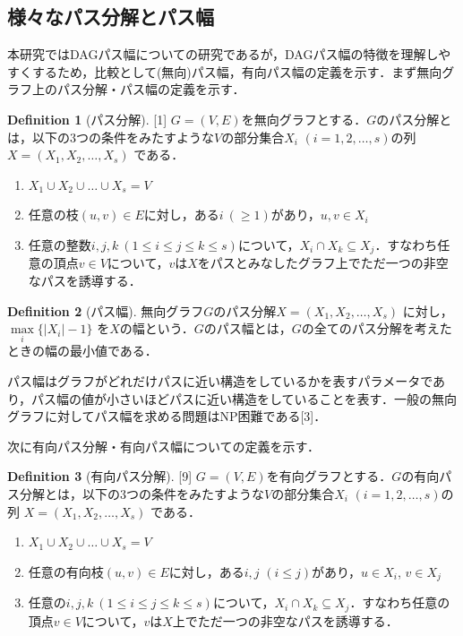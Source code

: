 \documentclass[master]{kuisthesis}		%
\theoremstyle{plain}
\theoremstyle{definition}
\newtheorem{definition*}{Definition}
\begin{document}
\subsection{様々なパス分解とパス幅} %
本研究ではDAGパス幅についての研究であるが，DAGパス幅の特徴を理解しやすくするため，比較として(無向)パス幅，有向パス幅の定義を示す．まず無向グラフ上のパス分解・パス幅の定義を示す．

\begin{definition*}[パス分解][1]
    $G=(V, E)$を無向グラフとする．$G$のパス分解とは，以下の3つの条件をみたすような$V$の部分集合$X_i$ $(i = 1, 2,  \dots, s)$の列 $X=(X_1, X_2,  \dots, X_s)$ である．
    
    \begin{enumerate}
        \item $ X_1 \cup X_2 \cup \dots \cup X_s = V $ 
        \item 任意の枝$(u, v) \in E $に対し，ある$i\ (\geq 1)$があり，$u, v \in X_i$
        \item 任意の整数$ i, j, k\ (1 \leq i \leq j \leq k \leq s)$について，$X_i \cap X_k \subseteq X_j$．すなわち任意の頂点$v \in V$について，$v$は$X$をパスとみなしたグラフ上でただ一つの非空なパスを誘導する．
    \end{enumerate}
\end{definition*}


\begin{definition*}[パス幅]
    無向グラフ$G$のパス分解$X=(X_1, X_2,   \dots, X_s)$ に対し，$ \underset{i}{\max} \{ |X_i|-1 \}$ を$X$の幅という．$G$のパス幅とは，$G$の全てのパス分解を考えたときの幅の最小値である．
\end{definition*}

パス幅はグラフがどれだけパスに近い構造をしているかを表すパラメータであり，パス幅の値が小さいほどパスに近い構造をしていることを表す．一般の無向グラフに対してパス幅を求める問題はNP困難である[3]．


 
次に有向パス分解・有向パス幅についての定義を示す．

\begin{definition*}[有向パス分解][9]
    $G=(V, E)$を有向グラフとする．$G$の有向パス分解とは，以下の3つの条件をみたすような$V$の部分集合$X_i$ $(i = 1, 2,  \dots, s)$の列 $X=(X_1, X_2,  \dots, X_s)$ である．
    
    \begin{enumerate}
        \item $ X_1 \cup X_2 \cup \dots \cup X_s = V $ 
        \item 任意の有向枝$(u, v) \in E$に対し，ある$i, j$ $(i \leq j)$があり，$u \in X_i$, $v \in X_j$
        \item 任意の$ i, j, k\ (1 \leq i \leq j \leq k \leq s)$について，$X_i \cap X_k \subseteq X_j$．すなわち任意の頂点$v \in V$について，$v$は$X$上でただ一つの非空なパスを誘導する．
    \end{enumerate}
\end{definition*}
\end{document}
